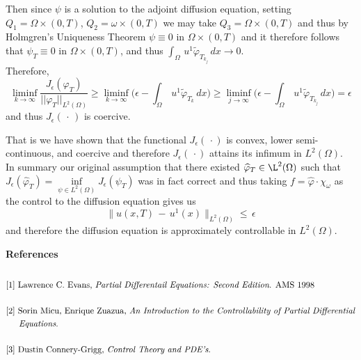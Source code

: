 \documentclass[11pt]{article}
\begin{document}
Then since $\psi$ is a solution to the adjoint diffusion equation, setting\\ $Q_1 = \Omega \times(0,T)$, $Q_2 = \omega \times(0,T)$ we may take $Q_3 = \Omega \times(0,T)$ and thus by Holmgren's Uniqueness Theorem $\psi \equiv 0$ in $\Omega \times (0,T)$ and it therefore follows that $\psi_T \equiv 0$ in $\Omega \times (0,T)$, and thus $\int_\Omega\,u^1\widetilde{\varphi}_{T_{k_j}}\,dx \rightarrow 0$.\\
Therefore, 
$$\liminf_{k \to\infty}\dfrac{J_\epsilon (\varphi_T)}{\lvert\lvert\varphi_T\rvert\rvert_{L^2(\Omega)}} \geq \liminf_{k \to\infty} \biggr( \epsilon - \int_\Omega\,u^1\widetilde{\varphi}_{T_k}\,dx\biggr)\geq \liminf_{j \to\infty} \biggr( \epsilon - \int_\Omega\,u^1\widetilde{\varphi}_{T_{k_j}}\,dx\biggr) = \epsilon$$
and thus $J_\epsilon(\,\cdot\,)$ is coercive.

That is we have shown that the functional $J_\epsilon(\,\cdot)$ is convex, lower semi-continuous, and coercive and therefore $J_\epsilon(\,\cdot)$ attains its infimum in $L^2(\Omega)$.\\

In summary our original assumption that there existed $\widehat{\varphi}_T \in\L^2(\Omega)$ such that $J_\epsilon (\widehat{\varphi}_T) = \inf\limits_{\psi \in L^2(\Omega)} J_\epsilon (\psi_T)$ was in fact correct and thus taking $f=\widehat{\varphi}\cdot\chi_\omega$ as the control to the diffusion equation gives us $$\rVert u(x,T)\,-\,u^1(x)\rVert_{L^2(\Omega)}\leq\,\epsilon$$ and therefore the diffusion equation is approximately controllable in $L^2(\Omega)$.

\newpage
\textbf{\Large References}\\\\
\begin{equation*}
\begin{aligned}
&[1] \text{ Lawrence C. Evans, \textit{Partial Differentail Equations: Second Edition}. AMS 1998}\\\\
&[2] \text{ Sorin Micu, Enrique Zuazua, \textit{An Introduction to the Controllability of Partial Differential}}\\& \,\,\,\,\,\,\,\,\,\text{\textit{Equations}.}\\\\
&[3] \text{ Dustin Connery-Grigg, \textit{Control Theory and PDE's}.}
\end{aligned}
\end{equation*}
\end{document}
